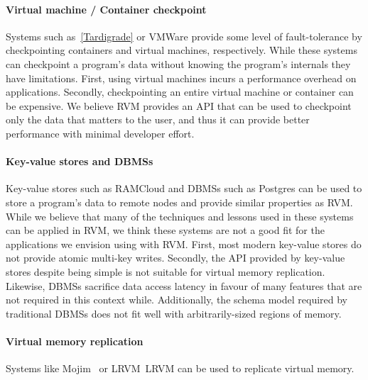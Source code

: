 \paragraph {\bf Virtual machine / Container checkpoint} Systems such
as~\ref{Tardigrade} or VMWare provide some level of fault-tolerance by
checkpointing containers and virtual machines, respectively. While these
systems can checkpoint a program's data without knowing the program's internals
they have limitations. First, using virtual machines incurs a performance
overhead on applications. Secondly, checkpointing an entire virtual machine or
container can be expensive. We believe RVM provides an API that can be used to
checkpoint only the data that matters to the user, and thus it can provide
better performance with minimal developer effort.

\paragraph {\bf Key-value stores and DBMSs} Key-value stores such as RAMCloud
and DBMSs such as Postgres can be used to store a program's data to remote nodes
and provide similar properties as RVM. While we believe that many of the
techniques and lessons used in these systems can be applied in RVM, we think
these systems are not a good fit for the applications we envision using with
RVM. First, most modern key-value stores do not provide atomic multi-key
writes. Secondly, the API provided by key-value stores despite being simple is
not suitable for virtual memory replication. Likewise, DBMSs sacrifice data
access latency in favour of many features that are not required in this context
while. Additionally, the schema model required by traditional DBMSs does not fit
well with arbitrarily-sized regions of memory.

\paragraph {\bf Virtual memory replication} Systems like Mojim~\cite{Mojim} or
LRVM~{LRVM} can be used to replicate virtual memory.
